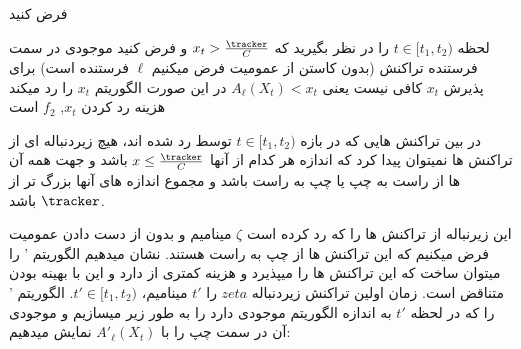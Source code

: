 فرض کنید 

لحظه  
$t \in [t_1,t_2)$
را در نظر بگیرید که 
$x_t > \frac{\tracker}{C}$
و فرض کنید موجودی \off  در سمت فرستنده تراکنش (بدون کاستن از عمومیت فرض میکنیم $\ell$ فرستنده است) برای پذیرش $x_t$ کافی نیست یعنی
$A_{\ell}(X_t) < x_t$
در این صورت الگوریتم \off
$x_t$
را رد میکند
هزینه رد کردن 
$x_t$,
$f_2$
است




در بین تراکنش هایی که در بازه 
$t \in [t_1,t_2)$
توسط \off رد شده اند، هیچ زیردنباله ای از تراکنش ها نمیتوان پیدا کرد که اندازه هر کدام از آنها
$x \leq \frac{\tracker}{C}$
باشد و جهت همه آن ها از راست به چپ یا چپ به راست باشد و مجموع اندازه های آنها بزرگ تر از 
$\tracker$
باشد.

 این زیرنباله از تراکنش ها را که \off رد کرده است 
$\zeta$
مینامیم و بدون از دست دادن عمومیت فرض میکنیم که این تراکنش ها از چپ به راست هستند. نشان میدهیم الگوریتم \off' را میتوان ساخت که این تراکنش ها را میپذیرد و هزینه کمتری از \off دارد و این با بهینه بودن \off متناقض است.
 زمان اولین تراکنش زیردنباله
$zeta$
 را 
$t'$
مینامیم،
$t' \in [t_1,t_2)$.
الگوریتم \off' را که در لحظه $t'$ به اندازه الگوریتم \off موجودی دارد را به طور زیر میسازیم و موجودی آن در سمت چپ را با 
$A'_{\ell}(X_t)$
نمایش میدهیم:





